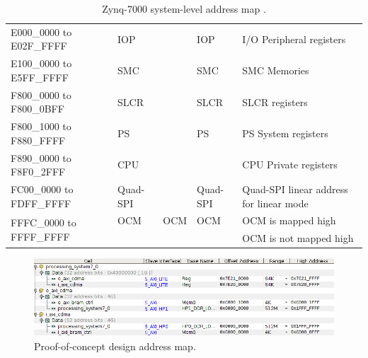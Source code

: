\begin{appendices}
\begin{table}
\begin{tabular}{lllll}
E000\_0000 to E02F\_FFFF                  & IOP          &         & IOP               & I/O Peripheral registers                              \\
E100\_0000 to E5FF\_FFFF                  & SMC          &         & SMC               & SMC Memories                                          \\
F800\_0000 to F800\_0BFF                  & SLCR         &         & SLCR              & SLCR registers                                        \\
F800\_1000 to F880\_FFFF                  & PS           &         & PS                & PS System registers                                   \\
F890\_0000 to F8F0\_2FFF                  & CPU          &         &                   & CPU Private registers                                 \\
FC00\_0000 to FDFF\_FFFF                  & Quad-SPI     &         & Quad-SPI          & Quad-SPI linear address for linear mode               \\
\multirow{2}{*}{FFFC\_0000 to FFFF\_FFFF} & OCM          & OCM     & OCM               & OCM is mapped high                                    \\
                                          &              &         &                   & OCM is not mapped high                               
\end{tabular}
\caption{Zynq-7000 system-level address map \cite{xilinx:ug585}.}
\label{table:zynq_address_map}
\end{table}

\begin{figure}
  \centering
  \includegraphics[width=1\textwidth]{./img/address_map.png}
  \caption{Proof-of-concept design address map.}
  \label{fig:poc_address_map}
\end{figure}


\end{appendices}
